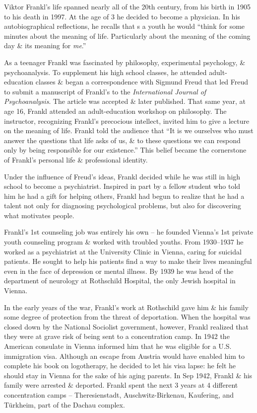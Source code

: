 \documentclass{article}
\numberwithin{equation}{section}
\begin{document}
Viktor Frankl's life spanned nearly all of the 20th century, from his birth in 1905 to his death in 1997. At the age of 3 he decided to become a physician. In his autobiographical reflections, he recalls that s a youth he would ``think for some minutes about the meaning of life. Particularly about the meaning of the coming day \& its meaning for \textit{me}.''

As a teenager Frankl was fascinated by philosophy, experimental psychology, \& psychoanalysis. To supplement his high school classes, he attended adult-education classes \& began a correspondence with Sigmund Freud that led Freud to submit a manuscript of Frankl's to the \textit{International Journal of Psychoanalysis}. The article was accepted \& later published. That same year, at age 16, Frankl attended an adult-education workshop on philosophy. The instructor, recognizing Frankl's precocious intellect, invited him to give a lecture on the meaning of life. Frankl told the audience that ``It is we ourselves who must answer the questions that life asks of us, \& to these questions we can respond only by being responsible for our existence.'' This belief became the cornerstone of Frankl's personal life \& professional identity.

Under the influence of Freud's ideas, Frankl decided while he was still in high school to become a psychiatrist. Inspired in part by a fellow student who told him he had a gift for helping others, Frankl had begun to realize that he had a talent not only for diagnosing psychological problems, but also for discovering what motivates people.

Frankl's 1st counseling job was entirely his own -- he founded Vienna's 1st private youth counseling program \& worked with troubled youths. From 1930--1937 he worked as a psychiatrist at the University Clinic in Vienna, caring for suicidal patients. He sought to help his patients find a way to make their lives meaningful even in the face of depression or mental illness. By 1939 he was head of the department of neurology at Rothschild Hospital, the only Jewish hospital in Vienna.

In the early years of the war, Frankl's work at Rothschild gave him \& his family some degree of protection from the threat of deportation. When the hospital was closed down by the National Sociolist government, however, Frankl realized that they were at grave risk of being sent to a concentration camp. In 1942 the American consulate in Vienna informed him that he was eligible for a U.S. immigration visa. Although an escape from Austria would have enabled him to complete his book on logotherapy, he decided to let his visa lapse: he felt he should stay in Vienna for the sake of his aging parents. In Sep 1942, Frankl \& his family were arrested \& deported. Frankl spent the next 3 years at 4 different concentration camps -- Theresienstadt, Auschwitz-Birkenau, Kaufering, and T\"urkheim, part of the Dachau complex.
\end{document}
